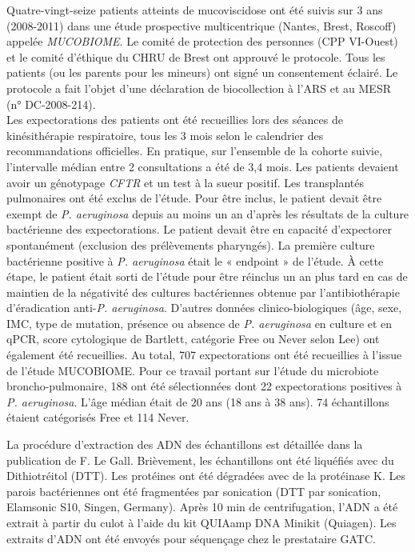 \documentclass[12pt,a4paper]{article}
\begin{document}
Quatre-vingt-seize patients atteints de mucoviscidose ont été suivis sur 3 ans (2008-2011) dans une étude prospective multicentrique (Nantes, Brest, Roscoff) appelée \textit{MUCOBIOME}.
Le comité de protection des personnes (CPP VI-Ouest) et le comité d’éthique du CHRU de Brest ont approuvé le protocole. Tous les patients (ou les parents pour les mineurs) ont signé un consentement éclairé. Le protocole a fait l’objet d’une déclaration de biocollection à l’ARS et au MESR (n° DC-2008-214).\\
Les expectorations des patients ont été recueillies lors des séances de kinésithérapie respiratoire, tous les 3 mois selon le calendrier des recommandations officielles. En pratique, sur l’ensemble de la cohorte suivie, l’intervalle médian entre 2 consultations a été de 3,4 mois.
Les patients devaient avoir un génotypage \textit{CFTR} et un test à la sueur positif. Les transplantés pulmonaires ont été exclus de l’étude.
Pour être inclus, le patient devait être exempt de \textit{P. aeruginosa} depuis au moins un an d’après les résultats de la culture bactérienne des expectorations. Le patient devait être en capacité d’expectorer spontanément (exclusion des prélèvements pharyngés).
La première culture bactérienne positive à \textit{P. aeruginosa} était le « endpoint » de l’étude. À cette étape, le patient était sorti de l’étude pour être réinclus un an plus tard en cas de maintien de la négativité des cultures bactériennes obtenue par l’antibiothérapie d’éradication anti-\textit{P. aeruginosa}. D’autres données clinico-biologiques (âge, sexe, IMC, type de mutation, présence ou absence de \textit{P. aeruginosa} en culture et en qPCR, score cytologique de Bartlett, catégorie Free ou Never selon Lee\cite{Lee2003}) ont également été recueillies. Au total, 707 expectorations ont été recueillies à l’issue de l’étude MUCOBIOME. Pour ce travail portant sur l’étude du microbiote broncho-pulmonaire, 188 ont été sélectionnées dont 22 expectorations positives à \textit{P. aeruginosa}. L'âge médian était de 20 ans (18 ans à 38 ans). 74 échantillons étaient catégorisés Free et 114 Never.



La procédure d'extraction des ADN des échantillons est détaillée dans la publication de  F. Le Gall\cite{LeGall}. Brièvement, les échantillons ont été liquéfiés avec du Dithiotréitol (DTT). Les protéines ont été dégradées avec de la protéinase K.
Les parois bactériennes ont été fragmentées par sonication (DTT par sonication, Elamsonic S10, Singen, Germany). Après 10 min de centrifugation, l’ADN a été extrait à partir du culot à l'aide du kit QUIAamp DNA Minikit (Quiagen).
Les extraits d’ADN ont été envoyés pour séquençage chez le prestataire GATC.
\end{document}
